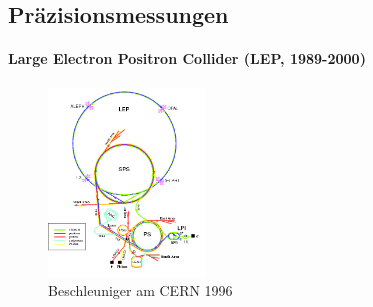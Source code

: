 \subsection{Präzisionsmessungen}
\begin{iframe}
	\framesubtitle{Large Electron Positron Collider (LEP, 1989-2000)}
	\begin{figure}
		\includegraphics[height=5cm]{img/lep}
		\caption*{Beschleuniger am CERN 1996 \cite{lepacc}}
	\end{figure}
\end{iframe}

